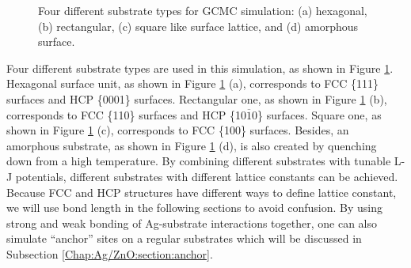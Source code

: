 \begin{figure}[!ht]
  \label{Chap:Ag/ZnO:fig:3d}
\caption[Four different substrate types for GCMC simulation.]{Four different substrate types for GCMC simulation: (a) hexagonal, (b) rectangular, (c) square like surface lattice, and (d) amorphous surface. }
  \label{Chap:Ag/ZnO:fig3}
\end{figure}
\endgroup

Four different substrate types are used in this simulation, as shown in Figure \ref{Chap:Ag/ZnO:fig3}. Hexagonal surface unit, as shown in Figure \ref{Chap:Ag/ZnO:fig3} (a), corresponds to \ac{FCC} \{111\} surfaces and \ac{HCP} \{0001\} surfaces. Rectangular one, as shown in Figure \ref{Chap:Ag/ZnO:fig3} (b), corresponds to \ac{FCC} \{110\} surfaces and \ac{HCP} \{10$\overline{1}$0\} surfaces. Square one, as shown in Figure \ref{Chap:Ag/ZnO:fig3} (c), corresponds to \ac{FCC} \{100\} surfaces. Besides, an amorphous substrate, as shown in Figure \ref{Chap:Ag/ZnO:fig3} (d), is also created by quenching down from a high temperature. By combining different substrates with tunable \ac{L-J} potentials, different substrates with different lattice constants can be achieved. Because \ac{FCC} and \ac{HCP} structures have different ways to define lattice constant, we will use bond length in the following sections to avoid confusion. By using strong and weak bonding of Ag-substrate interactions together, one can also simulate ``anchor'' sites on a regular substrates which will be discussed in Subsection \ref{Chap:Ag/ZnO:section:anchor}.